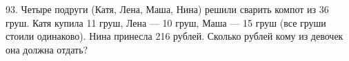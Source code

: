 93. Четыре подруги (Катя, Лена, Маша, Нина) решили сварить компот из 36 груш. Катя купила 11 груш, Лена --- 10 груш, Маша --- 15 груш (все груши стоили одинаково). Нина принесла 216 рублей. Сколько рублей кому из девочек она должна отдать?\\
